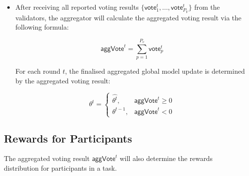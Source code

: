 \documentclass[conference]{IEEEtran}
\begin{document}
\begin{itemize}
\item After receiving all reported voting results $\{\mathsf{vote}_1^t, ..., \mathsf{vote}_{P_V}^t\}$ from the validators, the aggregator will  calculate the aggregated voting result via the following formula:

\begin{equation*}
  \mathsf{aggVote}^t= \sum_{p = 1}^{ P_v}  \mathsf{vote}_p^t
\end{equation*}

For each round $t$, the finalised aggregated global model update is determined by the aggregated voting result:

\begin{equation*}
  \theta^t =
    \begin{cases}
      \hat{\theta^t}, & \mathsf{aggVote}^t \geq 0 \\
      \theta^{t-1}, & \mathsf{aggVote}^t < 0
    \end{cases} 
\end{equation*}


\end{itemize}



\subsection{\FL Rewards for Participants} The aggregated voting result $\mathsf{aggVote}^t$ will also determine the rewards distribution for participants in a \FL task.





\end{document}
